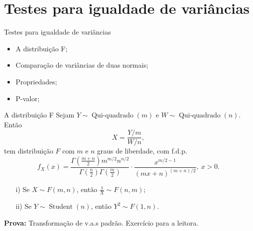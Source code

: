 \section{Testes para igualdade de variâncias}
\begin{frame}{Testes para igualdade de variâncias}
 \begin{itemize}
   \item A distribuição F;
   \item Comparação de variâncias de duas normais;
   \item Propriedades; 
   \item P-valor;
   \end{itemize}
\end{frame}


 \begin{frame}{A distribuição F}
  Sejam $Y \sim\operatorname{Qui-quadrado}(m)$ e $W \sim\operatorname{Qui-quadrado}(n)$.
  Então 
  \begin{equation*}
   X = \frac{Y/m}{W/n},
  \end{equation*}
tem distribuição $F$ com $m$ e $n$ graus de liberdade, com f.d.p.
\begin{equation*}
    f_X(x) = \frac{\Gamma\left(\frac{m + n}{2}\right)m^{m/2} n^{n/2}}{\Gamma\left(\frac{n}{2}\right)\Gamma\left(\frac{m}{2}\right)} \cdot \frac{x^{m/2-1}}{(mx + n)^{(m + n)/2}}, \: x > 0.
\end{equation*}
\begin{theo}
\label{thm:F_distribution_properties}
 \begin{itemize}
  \item[i)] Se $X \sim F(m, n)$, então $\frac{1}{X} \sim F(n, m)$;
  \item[ii)] Se $Y \sim\operatorname{Student}(n)$, então $Y^2 \sim F(1, n)$.
 \end{itemize}
\end{theo}
\textbf{Prova:} Transformação de v.a.s padrão.
Exercício para a leitora.
 \end{frame}

